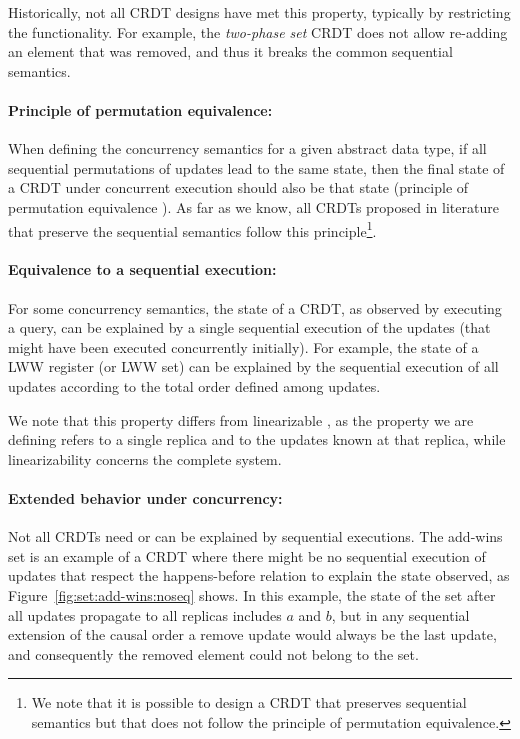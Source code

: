 \documentclass[12pt]{article}
\begin{document}
Historically, not all CRDT designs have met this property, typically by restricting
the functionality. 
For example, the \emph{two-phase set} CRDT \cite{Shapiro11Conflict} does not allow 
re-adding an element that was removed, and thus it breaks the common sequential 
semantics.

\paragraph{Principle of permutation equivalence:}
When defining the concurrency semantics for a given abstract data type, 
if all sequential permutations of updates
lead to the same state, then the final state of a CRDT under concurrent 
execution should also be that state
(principle of permutation equivalence \cite{Bieniusa12Semantics}).
As far as we know, all CRDTs proposed in literature that preserve the 
sequential semantics follow this principle\footnote{We note that it is possible
to design a CRDT that preserves sequential semantics but that does not
follow the principle of permutation equivalence.}.

\paragraph{Equivalence to a sequential execution:}
For some concurrency semantics, the state of a CRDT, as observed by executing 
a query, can be explained by a single sequential execution of the
updates (that might have been executed concurrently initially).
For example, the state of a LWW register (or LWW set) can be explained by
the sequential execution of all updates according to the total order 
defined among updates.

We note that this property differs from linearizable \cite{linearizability}, as
the property we are defining refers to a single replica and to the updates known 
at that replica, while linearizability concerns the complete system.

\paragraph{Extended behavior under concurrency:}
Not all CRDTs need or can be explained by sequential executions. 
The add-wins set is an example of a CRDT where there might be no sequential 
execution of updates that respect the happens-before relation to explain the state observed, 
as Figure~\ref{fig:set:add-wins:noseq} shows.
In this example, the state of the set after all updates propagate to all 
replicas includes $a$ and $b$, but in any sequential extension of the causal 
order a remove update would always be the last update, and consequently 
the removed element could not belong to the set.
\end{document}
